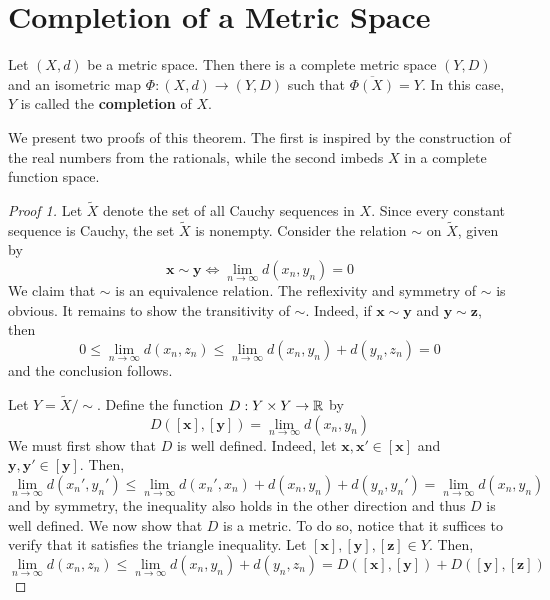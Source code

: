 \section{Completion of a Metric Space}

\begin{theorem}
    Let $(X,d)$ be a metric space. Then there is a complete metric space $(Y,D)$ and an isometric map $\Phi: (X,d)\to(Y,D)$ such that $\overline{\Phi(X)} = Y$. In this case, $Y$ is called the \textbf{completion} of $X$.
\end{theorem}

We present two proofs of this theorem. The first is inspired by the construction of the real numbers from the rationals, while the second imbeds $X$ in a complete function space.

\begin{proof}[Proof 1]
    Let $\widetilde X$ denote the set of all Cauchy sequences in $X$. Since every constant sequence is Cauchy, the set $\widetilde X$ is nonempty. Consider the relation $\sim$ on $\widetilde X$, given by 
    \begin{equation*}
        \mathbf x\sim\mathbf y \Longleftrightarrow\lim_{n\to\infty}d(x_n,y_n) = 0
    \end{equation*}
    We claim that $\sim$ is an equivalence relation. The reflexivity and symmetry of $\sim$ is obvious. It remains to show the transitivity of $\sim$. Indeed, if $\mathbf x\sim\mathbf y$ and $\mathbf y\sim\mathbf z$, then 
    \begin{equation*}
        0\le\lim_{n\to\infty}d(x_n,z_n)\le\lim_{n\to\infty}d(x_n,y_n) + d(y_n, z_n) = 0
    \end{equation*}
    and the conclusion follows.

    Let $Y = \widetilde X/\sim$. Define the function $D:Y\times Y\to\mathbb{R}$ by 
    \begin{equation*}
        D([\mathbf x], [\mathbf y]) = \lim_{n\to\infty}d(x_n,y_n)
    \end{equation*}
    We must first show that $D$ is well defined. Indeed, let $\mathbf x,\mathbf x'\in[\mathbf x]$ and $\mathbf y,\mathbf y'\in[\mathbf y]$. Then, 
    \begin{equation*}
        \lim_{n\to\infty}d(x_n',y_n')\le\lim_{n\to\infty}d(x_n',x_n) + d(x_n,y_n) + d(y_n,y_n') = \lim_{n\to\infty}d(x_n,y_n)
    \end{equation*}
    and by symmetry, the inequality also holds in the other direction and thus $D$ is well defined. We now show that $D$ is a metric. To do so, notice that it suffices to verify that it satisfies the triangle inequality. Let $[\mathbf x],[\mathbf y],[\mathbf z]\in Y$. Then, 
    \begin{equation*}
        \lim_{n\to\infty}d(x_n, z_n)\le\lim_{n\to\infty}d(x_n, y_n) + d(y_n, z_n) = D([\mathbf x],[\mathbf y]) + D([\mathbf y],[\mathbf z])
    \end{equation*}


\end{proof}
